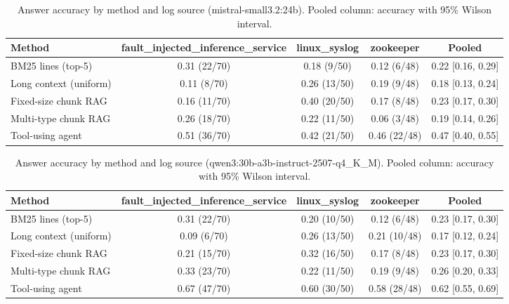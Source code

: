 \begin{table}[t]
\centering
\caption{Answer accuracy by method and log source (mistral-small3.2:24b). Pooled column: accuracy with 95\% Wilson interval.}
\label{tab:main_comparison__mistral_small_3_2_24b}
\begin{tabular}{@{}lcccc@{}}
\toprule
Method & fault\_injected\_inference\_service & linux\_syslog & zookeeper & Pooled \\
\midrule
BM25 lines (top-5) & 0.31 (22/70) & 0.18 (9/50) & 0.12 (6/48) & 0.22 [0.16, 0.29] \\
Long context (uniform) & 0.11 (8/70) & 0.26 (13/50) & 0.19 (9/48) & 0.18 [0.13, 0.24] \\
Fixed-size chunk RAG & 0.16 (11/70) & 0.40 (20/50) & 0.17 (8/48) & 0.23 [0.17, 0.30] \\
Multi-type chunk RAG & 0.26 (18/70) & 0.22 (11/50) & 0.06 (3/48) & 0.19 [0.14, 0.26] \\
Tool-using agent & 0.51 (36/70) & 0.42 (21/50) & 0.46 (22/48) & 0.47 [0.40, 0.55] \\
\bottomrule
\end{tabular}
\end{table}

\begin{table}[t]
\centering
\caption{Answer accuracy by method and log source (qwen3:30b-a3b-instruct-2507-q4_K_M). Pooled column: accuracy with 95\% Wilson interval.}
\label{tab:main_comparison__qwen3_30b_a3b_instruct}
\begin{tabular}{@{}lcccc@{}}
\toprule
Method & fault\_injected\_inference\_service & linux\_syslog & zookeeper & Pooled \\
\midrule
BM25 lines (top-5) & 0.31 (22/70) & 0.20 (10/50) & 0.12 (6/48) & 0.23 [0.17, 0.30] \\
Long context (uniform) & 0.09 (6/70) & 0.26 (13/50) & 0.21 (10/48) & 0.17 [0.12, 0.24] \\
Fixed-size chunk RAG & 0.21 (15/70) & 0.32 (16/50) & 0.17 (8/48) & 0.23 [0.17, 0.30] \\
Multi-type chunk RAG & 0.33 (23/70) & 0.22 (11/50) & 0.19 (9/48) & 0.26 [0.20, 0.33] \\
Tool-using agent & 0.67 (47/70) & 0.60 (30/50) & 0.58 (28/48) & 0.62 [0.55, 0.69] \\
\bottomrule
\end{tabular}
\end{table}

